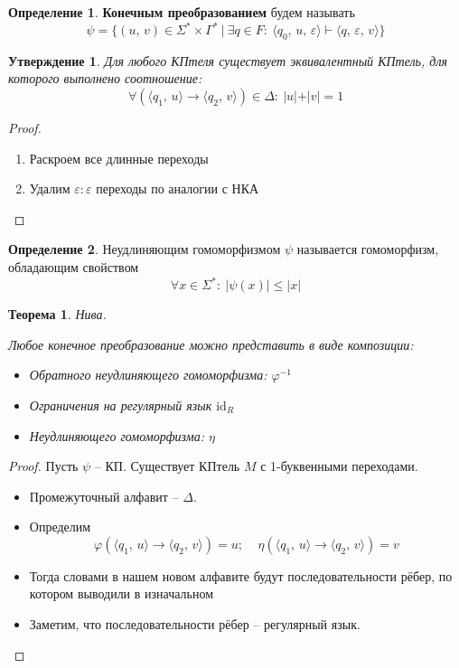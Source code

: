 \documentclass[a4paper,12pt]{article}
\renewcommand{\phi}{\ensuremath{\varphi}}
\renewcommand{\leq}{\ensuremath{\leqslant}}
\theoremstyle{plain}
\newtheorem{theorem}{Теорема}[subsection]
\newtheorem{proposition}{Утверждение}[subsection]
\theoremstyle{definition}
\newtheorem{definition}{Определение}[subsection]
\theoremstyle{remark}
\begin{document}
\begin{definition}
	\textbf{Конечным преобразованием} будем называть
	\[
		\psi = \{(u,\,v) \in \Sigma^*\times\Gamma^* \:\vert\: \exists q \in F :\: \langle q_0,\,u,\,\varepsilon\rangle \vdash \langle q,\,\varepsilon,\,v\rangle\}
	\]
\end{definition}

\begin{proposition}
	Для любого КПтеля существует эквивалентный КПтель, для которого выполнено соотношение:
	\[
		\forall(\langle q_1,\,u\rangle\to\langle q_2,\, v\rangle) \in \Delta :\: \vert u\vert + \vert v\vert = 1
	\]
\end{proposition}

\begin{proof}
	\begin{enumerate}
		\item Раскроем все длинные переходы
		\item Удалим $\varepsilon:\varepsilon$ переходы по аналогии с НКА
	\end{enumerate}
\end{proof}

\begin{definition}
	Неудлиняющим гомоморфизмом $\psi$ называется  гомоморфизм, обладающим свойством
	\[
		\forall x \in \Sigma^* :\: \vert \psi(x)\vert \leq \vert x\vert
	\]
\end{definition}

\begin{theorem}
	Нива.

	Любое конечное преобразование можно представить в виде композиции:
	\begin{itemize}
		\item Обратного неудлиняющего гомоморфизма: $\phi^{-1}$
		\item Ограничения на регулярный язык $\text{id}_R$
		\item Неудлиняющего гомоморфизма: $\eta$
	\end{itemize}
\end{theorem}

\begin{proof}
	Пусть $\psi$ -- КП. Существует КПтель $M$ с 1-буквенными переходами.

	\begin{itemize}
		\item Промежуточный алфавит -- $\Delta$.
		\item Определим
		      \[
			      \phi(\langle q_1,\,u\rangle \to \langle q_2,\, v\rangle) = u;\;\;\;\;\eta(\langle q_1,\,u\rangle \to \langle q_2,\, v\rangle) = v
		      \]
		\item Тогда словами в нашем новом алфавите будут последовательности рёбер, по котором выводили в изначальном
		\item Заметим, что последовательности рёбер -- регулярный язык.
	\end{itemize}
\end{proof}
\end{document}
